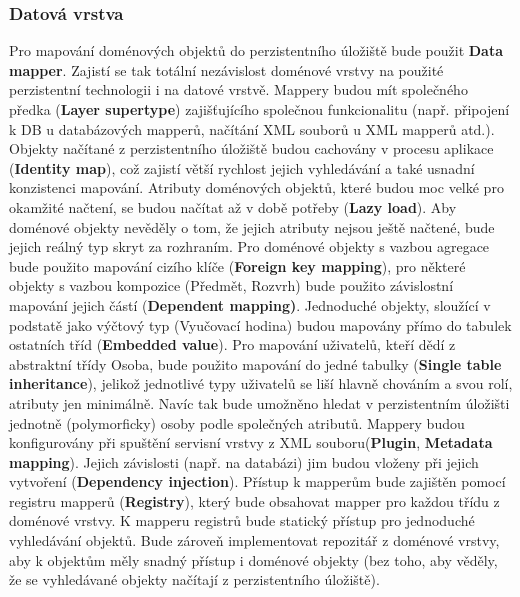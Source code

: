 \documentclass[a4paper,10pt,titlepage]{article}
\begin{document}
				\subsubsection*{Datová vrstva}
					Pro mapování doménových objektů do perzistentního úložiště bude použit \textbf{Data mapper}. Zajistí se tak totální nezávislost
					doménové vrstvy na použité perzistentní technologii i na datové vrstvě. Mappery budou mít společného předka (\textbf{Layer supertype})
					zajišťujícího společnou funkcionalitu (např. připojení k DB u databázových mapperů, načítání XML souborů u XML mapperů atd.).
					Objekty načítané z perzistentního úložiště budou cachovány v procesu aplikace (\textbf{Identity map}), což zajistí větší rychlost jejich vyhledávání
					a také usnadní konzistenci mapování. Atributy doménových objektů, které budou moc velké pro okamžité načtení, se budou načítat až v době potřeby
					(\textbf{Lazy load}). Aby doménové 	objekty nevěděly o tom, že jejich atributy nejsou ještě načtené, bude jejich reálný typ skryt za rozhraním.
					Pro doménové objekty s vazbou agregace bude použito mapování cizího klíče (\textbf{Foreign key mapping}), pro některé objekty s vazbou
					kompozice (Předmět, Rozvrh) bude použito závislostní mapování jejich částí (\textbf{Dependent mapping)}.
					Jednoduché objekty, sloužící v podstatě jako výčtový typ (Vyučovací hodina) budou mapovány přímo do tabulek ostatních tříd (\textbf{Embedded value}).
					Pro mapování uživatelů, kteří dědí z abstraktní třídy Osoba, bude použito mapování do jedné tabulky (\textbf{Single table inheritance}),
					jelikož jednotlivé typy uživatelů se liší hlavně chováním a svou rolí, atributy jen minimálně. Navíc tak bude umožněno hledat v perzistentním úložišti
					jednotně (polymorficky) osoby podle společných atributů. Mappery budou konfigurovány při spuštění servisní vrstvy z XML souboru(\textbf{Plugin},
					\textbf{Metadata mapping}). Jejich závislosti (např. na databázi) jim budou vloženy při jejich vytvoření (\textbf{Dependency injection}).
					Přístup k mapperům bude zajištěn pomocí registru mapperů (\textbf{Registry}), který bude obsahovat mapper pro každou třídu z doménové vrstvy.
					K mapperu registrů bude statický přístup pro jednoduché vyhledávání objektů. Bude zároveň implementovat repozitář z doménové vrstvy, aby k objektům
					měly snadný přístup i doménové objekty (bez toho, aby věděly, že se vyhledávané objekty načítají z perzistentního úložiště).
		
\end{document}
